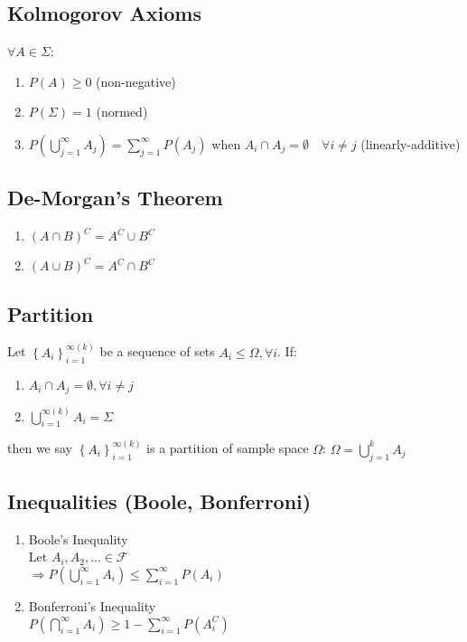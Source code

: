 \documentclass[12pt]{article}
\newcommand{\bb}[1]{\left\{#1\right\}}
\newcommand{\pp}[1]{\left(#1\right)}
\begin{document}
\subsection{Kolmogorov Axioms}

$\forall A \in \Sigma$:

\begin{enumerate}
	\item $P(A) \ge 0$ (non-negative)
	\item $P(\Sigma) = 1$ (normed)
	\item $P \pp{\bigcup_{j = 1}^\infty A_j} = \sum_{j = 1}^\infty P(A_j)$ when $A_i \cap A_j = \emptyset \quad \forall i \ne j$ (linearly-additive)
\end{enumerate}

\subsection{De-Morgan's Theorem}

\begin{enumerate}
	\item $(A \cap B)^C = A^C \cup B^C$ 
	\item $(A \cup B)^C = A^C \cap B^C$
\end{enumerate}

\subsection{Partition}

Let $\bb{A_i}_{i = 1}^{\infty (k)}$ be a sequence of sets $A_i \le \Omega, \forall i$. If:

\begin{enumerate}
	\item $A_i \cap A_j = \emptyset, \forall i \ne j$ 
	\item $\bigcup_{i = 1}^{\infty (k)} A_i = \Sigma$
\end{enumerate}

then we say $\bb{A_i}_{i = 1}^{\infty (k)}$ is a partition of sample space $\Omega$: $\Omega = \bigcup_{j = 1}^k A_j$

\subsection{Inequalities (Boole, Bonferroni)}

\begin{enumerate}
	\item Boole's Inequality \\
	Let $A_i, A_2, ... \in \mathcal{F}$ \\
	$\Rightarrow P\pp{\bigcup_{i = 1}^\infty A_i} \le \sum_{i = 1}^\infty P(A_i)$ 
	\item Bonferroni's Inequality \\
	$P\pp{\bigcap_{i = 1}^\infty A_i} \ge 1 - \sum_{i = 1}^\infty P(A_i^C)$
\end{enumerate}
\end{document}

